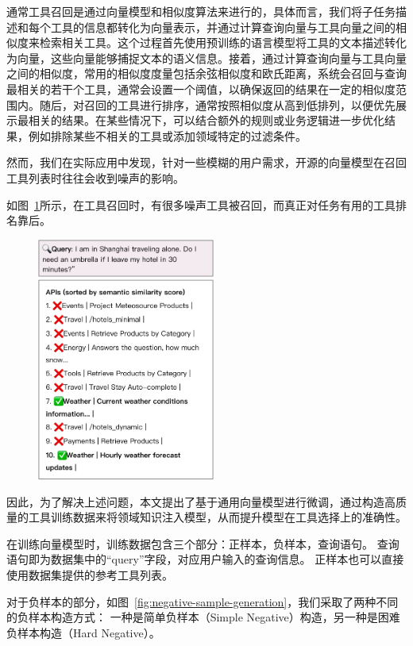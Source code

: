 通常工具召回是通过向量模型和相似度算法来进行的，具体而言，我们将子任务描述和每个工具的信息都转化为向量表示，并通过计算查询向量与工具向量之间的相似度来检索相关工具。这个过程首先使用预训练的语言模型将工具的文本描述转化为向量，这些向量能够捕捉文本的语义信息。接着，通过计算查询向量与工具向量之间的相似度，常用的相似度度量包括余弦相似度和欧氏距离，系统会召回与查询最相关的若干个工具，通常会设置一个阈值，以确保返回的结果在一定的相似度范围内。随后，对召回的工具进行排序，通常按照相似度从高到低排列，以便优先展示最相关的结果。在某些情况下，可以结合额外的规则或业务逻辑进一步优化结果，例如排除某些不相关的工具或添加领域特定的过滤条件。

然而，我们在实际应用中发现，针对一些模糊的用户需求，开源的向量模型在召回工具列表时往往会收到噪声的影响。

如图~\ref{fig:why-tune}所示，在工具召回时，有很多噪声工具被召回，而真正对任务有用的工具排名靠后。

\begin{figure}[!htp]
  \vspace{1em}
  \centering
  \setlength{\abovecaptionskip}{10pt} %
  \includegraphics[height=8cm]{../assets/ch3-为何需要微调.pdf}
  \label{fig:why-tune}
\end{figure}

因此，为了解决上述问题，本文提出了基于通用向量模型进行微调，通过构造高质量的工具训练数据来将领域知识注入模型，从而提升模型在工具选择上的准确性。

在训练向量模型时，训练数据包含三个部分：正样本，负样本，查询语句。
查询语句即为数据集中的“query”字段，对应用户输入的查询信息。
正样本也可以直接使用数据集提供的参考工具列表。

对于负样本的部分，如图~\ref{fig:negative-sample-generation}，我们采取了两种不同的负样本构造方式：
一种是简单负样本（Simple Negative）构造，另一种是困难负样本构造（Hard Negative）。

